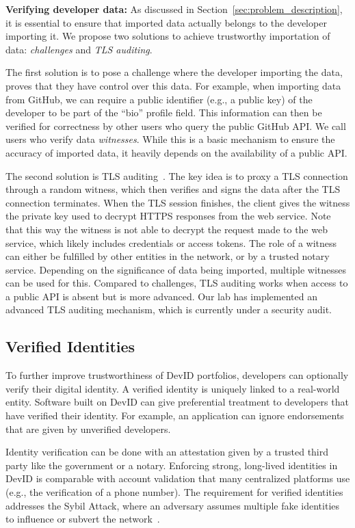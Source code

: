\textbf{Verifying developer data:}
As discussed in Section~\ref{sec:problem_description}, it is essential to ensure that imported data actually belongs to the developer importing it.
We propose two solutions to achieve trustworthy importation of data: \textit{challenges} and \textit{TLS auditing}.

The first solution is to pose a challenge where the developer importing the data, proves that they have control over this data.
For example, when importing data from GitHub, we can require a public identifier (e.g., a public key) of the developer to be part of the \enquote{bio} profile field.
This information can then be verified for correctness by other users who query the public GitHub API.
We call users who verify data \emph{witnesses}.
While this is a basic mechanism to ensure the accuracy of imported data, it heavily depends on the availability of a public API.

The second solution is TLS auditing~\cite{tlsnotary2014whitepaper}.
The key idea is to proxy a TLS connection through a random witness, which then verifies and signs the data after the TLS connection terminates.
When the TLS session finishes, the client gives the witness the private key used to decrypt HTTPS responses from the web service.
Note that this way the witness is not able to decrypt the request made to the web service, which likely includes credentials or access tokens.
The role of a witness can either be fulfilled by other entities in the network, or by a trusted notary service.
Depending on the significance of data being imported, multiple witnesses can be used for this.
Compared to challenges, TLS auditing works when access to a public API is absent but is more advanced.
Our lab has implemented an advanced TLS auditing mechanism, which is currently under a security audit.

\subsection{Verified Identities}
\label{subsec:strong_identities}
To further improve trustworthiness of DevID portfolios, developers can optionally verify their digital identity.
A verified identity is uniquely linked to a real-world entity.
Software built on DevID can give preferential treatment to developers that have verified their identity.
For example, an application can ignore endorsements that are given by unverified developers.

Identity verification can be done with an attestation given by a trusted third party like the government or a notary.
Enforcing strong, long-lived identities in DevID is comparable with account validation that many centralized platforms use (e.g., the verification of a phone number).
The requirement for verified identities addresses the Sybil Attack, where an adversary assumes multiple fake identities to influence or subvert the network~\cite{douceur2002sybil}.

